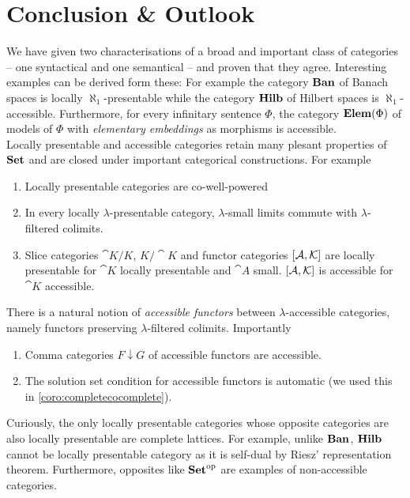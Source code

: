 \section{Conclusion \& Outlook}
\label{sec:conclusion}

We have given two characterisations of a broad and important class of categories -- one syntactical and one semantical -- and proven that they agree. Interesting examples can be derived form these: For example the category $\mathbf{Ban}$ of Banach spaces is locally $\aleph_1$-presentable while the category $\mathbf{Hilb}$ of Hilbert spaces is $\aleph_1$-accessible. Furthermore, for every infinitary sentence $\Phi$, the category $\mathbf{Elem}(\Phi)$ of models of $\Phi$ with \emph{elementary embeddings} as morphisms is accessible. \\

Locally presentable and accessible categories retain many plesant properties of $\mathbf{Set}$ and are closed under important categorical constructions. For example
\begin{enumerate}
\item Locally presentable categories are co-well-powered
\item In every locally $\lambda$-presentable category, $\lambda$-small limits commute with $\lambda$-filtered colimits.
\item Slice categories $\cat K/K$, $K/\cat K$ and functor categories $[\mathcal{A},\mathcal{K}]$ are locally presentable for $\cat K$ locally presentable and $\cat A$ small. $[\mathcal{A},\mathcal{K}]$ is accessible for $\cat K$ accessible.
\end{enumerate}
There is a natural notion of \emph{accessible functors} between $\lambda$-accessible categories, namely functors preserving $\lambda$-filtered colimits. Importantly
\begin{enumerate}[resume]
\item Comma categories $F \downarrow G$ of accessible functors are accessible.
\item The solution set condition for accessible functors is automatic (we used this in \ref{coro:completecocomplete}).
\end{enumerate}
Curiously, the only locally presentable categories whose opposite categories are also locally presentable are complete lattices. For example, unlike $\mathbf{Ban}$, $\mathbf{Hilb}$ cannot be locally presentable category as it is self-dual by Riesz' representation theorem. Furthermore, opposites like $\mathbf{Set}^{\textrm{op}}$ are examples of non-accessible categories. \\

